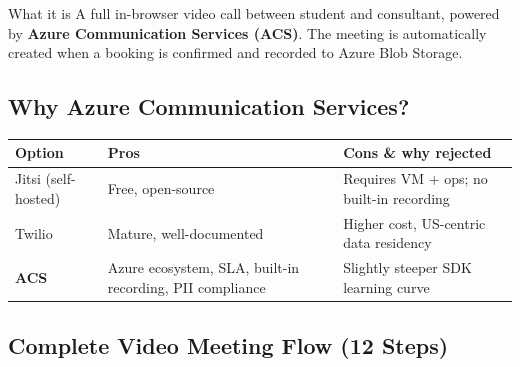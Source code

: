 \documentclass[11pt,a4paper]{article}
\begin{document}
\begin{keybox}{What it is}
A full in-browser video call between student and consultant, powered by
\textbf{Azure Communication Services (ACS)}.
The meeting is automatically created when a booking is confirmed
and recorded to Azure Blob Storage.
\end{keybox}

\subsection{Why Azure Communication Services?}

\begin{center}
\begin{tabular}{lp{5.5cm}p{5.5cm}}
\toprule
\textbf{Option} & \textbf{Pros} & \textbf{Cons \& why rejected}\\
\midrule
Jitsi (self-hosted) & Free, open-source & Requires VM + ops; no built-in recording\\
Twilio & Mature, well-documented & Higher cost, US-centric data residency\\
\textbf{ACS} & Azure ecosystem, SLA, built-in recording, PII compliance & Slightly steeper SDK learning curve\\
\bottomrule
\end{tabular}
\end{center}

\subsection{Complete Video Meeting Flow (12 Steps)}
\end{document}
